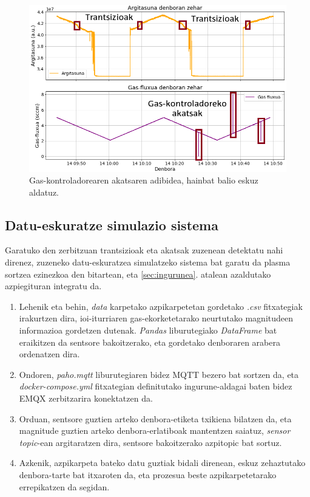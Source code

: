 \documentclass[12pt]{article}
\numberwithin{figure}{section}
\numberwithin{equation}{section}
\begin{document}
\begin{figure}[h]
    \centering
    \includegraphics[width=0.8\linewidth]{3 - Neurketak/gas-ekorketa_akatsahutsa.png}
    \caption{Gas-kontroladorearen akatsaren adibidea, hainbat balio eskuz aldatuz.}
    \label{fig:gas-ekorketa-akatsa}
\end{figure}

\subsection{Datu-eskuratze simulazio sistema}
Garatuko den zerbitzuan trantsizioak eta akatsak zuzenean detektatu nahi direnez, zuzeneko datu\hyp{}eskuratzea simulatzeko sistema bat garatu da plasma sortzea ezinezkoa den bitartean, eta \ref{sec:ingurunea}. atalean azaldutako azpiegituran integratu da.

\begin{enumerate}
    \item Lehenik eta behin, \textit{data} karpetako azpikarpetetan gordetako \textit{.csv} fitxategiak irakurtzen dira, ioi-iturriaren gas-ekorketetarako neurtutako magnitudeen informazioa gordetzen dutenak. \textit{Pandas} liburutegiako \textit{DataFrame} bat eraikitzen da sentsore bakoitzerako, eta gordetako denboraren arabera ordenatzen dira.
    \item Ondoren, \textit{paho.mqtt} liburutegiaren bidez MQTT bezero bat sortzen da, eta \textit{docker-compose.yml} fitxategian definitutako ingurune-aldagai baten bidez EMQX zerbitzarira konektatzen da.
    \item Orduan, sentsore guztien arteko denbora-etiketa txikiena bilatzen da, eta magnitude guztien arteko denbora-erlatiboak mantentzen saiatuz, \textit{sensor} \textit{topic}-ean argitaratzen dira, sentsore bakoitzerako azpitopic bat sortuz.
    \item Azkenik, azpikarpeta bateko datu guztiak bidali direnean, eskuz zehaztutako denbora-tarte bat itxaroten da, eta prozesua beste azpikarpetetarako errepikatzen da segidan.
\end{enumerate}
\end{document}
